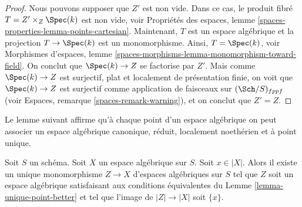\begin{proof}
Nous pouvons supposer que $Z'$ est non vide. Dans ce cas, le
produit fibré $T = Z' \times_Z \Spec(k)$
est non vide, voir
Propriétés des espaces, lemme \ref{spaces-properties-lemma-points-cartesian}.
Maintenant, $T$ est un espace algébrique et la projection
$T \to \Spec(k)$ est un monomorphisme. Ainsi, $T = \Spec(k)$, voir
Morphismes d'espaces, lemme
\ref{spaces-morphisms-lemma-monomorphism-toward-field}.
On conclut que $\Spec(k) \to Z$ se factorise par $Z'$.
Mais comme $\Spec(k) \to Z$ est surjectif, plat et localement de présentation
finie, on voit que $\Spec(k) \to Z$ est surjectif comme application de
faisceaux sur $(\Sch/S)_{fppf}$ (voir
Espaces, remarque \ref{spaces-remark-warning}),
et on conclut que $Z' = Z$.
\end{proof}

\noindent
Le lemme suivant affirme qu'à chaque point d'un espace algébrique on
peut associer un espace algébrique canonique, réduit, localement noethérien
et à point unique.

\begin{lemma}
\label{lemma-find-singleton-from-point}
Soit $S$ un schéma. Soit $X$ un espace algébrique sur $S$.
Soit $x \in |X|$. Alors il existe un unique monomorphisme
$Z \to X$ d'espaces algébriques
sur $S$ tel que $Z$ soit un espace algébrique satisfaisant aux conditions
équivalentes du
Lemme \ref{lemma-unique-point-better}
et tel que l'image de $|Z| \to |X|$ soit $\{x\}$.
\end{lemma}

